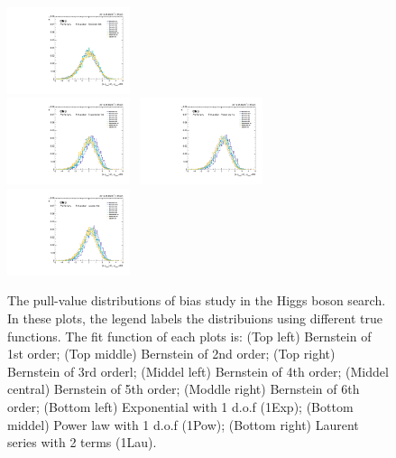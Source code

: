 \begin{figure}[p]
  \includegraphics[width=0.32\textwidth]{Fig/BiasStudy/Pull/HJpsiG/pull_fitfunc5_leastbias}\\
  \includegraphics[width=0.32\textwidth]{Fig/BiasStudy/Pull/HJpsiG/pull_fitfunc6_leastbias}~
  \includegraphics[width=0.32\textwidth]{Fig/BiasStudy/Pull/HJpsiG/pull_fitfunc7_leastbias}~
  \includegraphics[width=0.32\textwidth]{Fig/BiasStudy/Pull/HJpsiG/pull_fitfunc8_leastbias}\\
  \caption{The pull-value distributions of bias study in the Higgs boson search. In these plots, the legend labels the distribuions using different true functions. The fit function of each plots is: (Top left) Bernstein of 1st order; (Top middle) Bernstein of 2nd order; (Top right) Bernstein of 3rd orderl; (Middel left) Bernstein of 4th order; (Middel central) Bernstein of 5th order; (Moddle right) Bernstein of 6th order; (Bottom left) Exponential with 1 d.o.f (1Exp); (Bottom middel) Power law with 1 d.o.f (1Pow); (Bottom right) Laurent series with 2 terms (1Lau).}
  \label{fig:Pull_HJpsiG_v2}
\end{figure}

